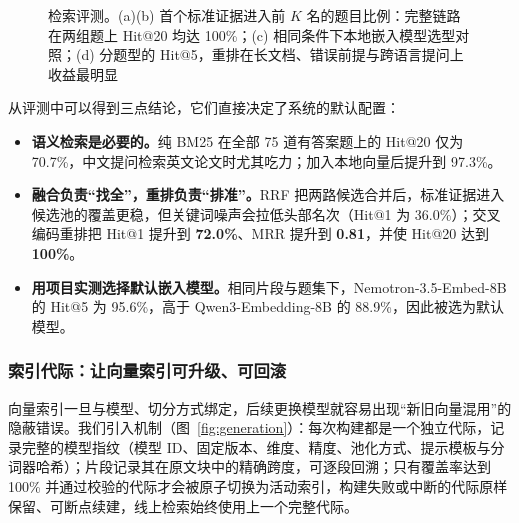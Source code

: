 \begin{figure}[!htb]
\caption{检索评测。(a)(b) 首个标准证据进入前 $K$ 名的题目比例：完整链路在两组题上 Hit@20 均达 100\%；(c) 相同条件下本地嵌入模型选型对照；(d) 分题型的 Hit@5，重排在长文档、错误前提与跨语言提问上收益最明显}
\label{fig:retrieval-eval}
\end{figure}

从评测中可以得到三点结论，它们直接决定了系统的默认配置：

\begin{itemize}
  \item \textbf{语义检索是必要的。}纯 BM25 在全部 75 道有答案题上的 Hit@20 仅为 70.7\%，中文提问检索英文论文时尤其吃力；加入本地向量后提升到 97.3\%。
  \item \textbf{融合负责“找全”，重排负责“排准”。}RRF 把两路候选合并后，标准证据进入候选池的覆盖更稳，但关键词噪声会拉低头部名次（Hit@1 为 36.0\%）；交叉编码重排把 Hit@1 提升到 \textbf{72.0\%}、MRR 提升到 \textbf{0.81}，并使 Hit@20 达到 \textbf{100\%}。
  \item \textbf{用项目实测选择默认嵌入模型。}相同片段与题集下，Nemotron-3.5-Embed-8B 的 Hit@5 为 95.6\%，高于 Qwen3-Embedding-8B 的 88.9\%，因此被选为默认模型。
\end{itemize}

\subsubsection{索引代际：让向量索引可升级、可回滚}

向量索引一旦与模型、切分方式绑定，后续更换模型就容易出现“新旧向量混用”的隐蔽错误。我们引入机制（图~\ref{fig:generation}）：每次构建都是一个独立代际，记录完整的模型指纹（模型 ID、固定版本、维度、精度、池化方式、提示模板与分词器哈希）；片段记录其在原文块中的精确跨度，可逐段回溯；只有覆盖率达到 100\% 并通过校验的代际才会被原子切换为活动索引，构建失败或中断的代际原样保留、可断点续建，线上检索始终使用上一个完整代际。

